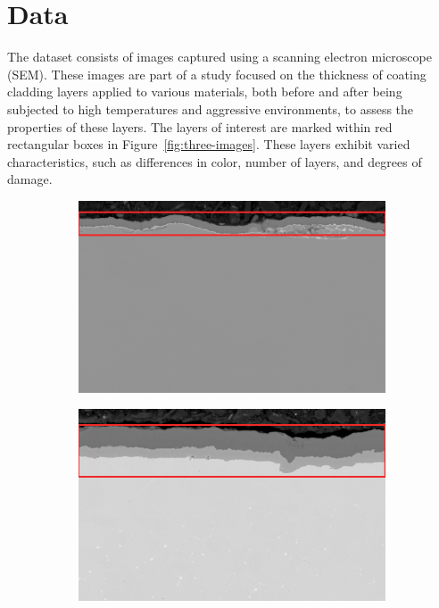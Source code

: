 \section{Data}

The dataset consists of images captured using a scanning electron microscope (SEM). These images are part of a study focused on the thickness of coating cladding layers applied to various materials, both before and after being subjected to high temperatures and aggressive environments, to assess the properties of these layers. The layers of interest are marked within red rectangular boxes in Figure~\ref{fig:three-images}. These layers exhibit varied characteristics, such as differences in color, number of layers, and degrees of damage.

\begin{figure}[ht]
    \centering
    \begin{subfigure}{0.3\textwidth}
        \centering
        \includegraphics[width=\linewidth]{PICTURES/original_data/11.png}
        \label{fig:subfig1}
    \end{subfigure}
    \hfill
    \begin{subfigure}{0.3\textwidth}
        \centering
        \includegraphics[width=\linewidth]{PICTURES/original_data/177.png}

\end{subfigure}
\end{figure}
